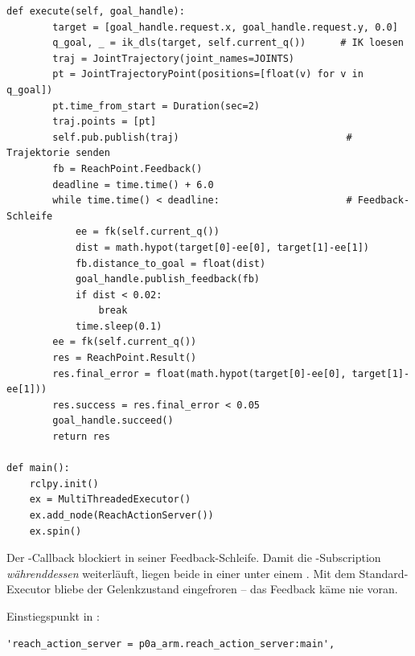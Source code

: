 \begin{lstlisting}[style=py,caption={\code{reach\_action\_server.py} -- \code{execute} + \code{main}}]
    def execute(self, goal_handle):
        target = [goal_handle.request.x, goal_handle.request.y, 0.0]
        q_goal, _ = ik_dls(target, self.current_q())      # IK loesen
        traj = JointTrajectory(joint_names=JOINTS)
        pt = JointTrajectoryPoint(positions=[float(v) for v in q_goal])
        pt.time_from_start = Duration(sec=2)
        traj.points = [pt]
        self.pub.publish(traj)                             # Trajektorie senden
        fb = ReachPoint.Feedback()
        deadline = time.time() + 6.0
        while time.time() < deadline:                      # Feedback-Schleife
            ee = fk(self.current_q())
            dist = math.hypot(target[0]-ee[0], target[1]-ee[1])
            fb.distance_to_goal = float(dist)
            goal_handle.publish_feedback(fb)
            if dist < 0.02:
                break
            time.sleep(0.1)
        ee = fk(self.current_q())
        res = ReachPoint.Result()
        res.final_error = float(math.hypot(target[0]-ee[0], target[1]-ee[1]))
        res.success = res.final_error < 0.05
        goal_handle.succeed()
        return res

def main():
    rclpy.init()
    ex = MultiThreadedExecutor()
    ex.add_node(ReachActionServer())
    ex.spin()
\end{lstlisting}

\begin{warnbox}[title={MultiThreadedExecutor + ReentrantCallbackGroup}]
Der -Callback blockiert in seiner Feedback-Schleife. Damit die
-Subscription \emph{währenddessen} weiterläuft, liegen beide
in einer  unter einem
. Mit dem Standard-Executor bliebe der Gelenkzustand
eingefroren -- das Feedback käme nie voran.
\end{warnbox}

\noindent Einstiegspunkt in :
\begin{lstlisting}[style=py,caption={\code{p0a\_arm/setup.py} -- \code{entry\_points}}]
'reach_action_server = p0a_arm.reach_action_server:main',
\end{lstlisting}

